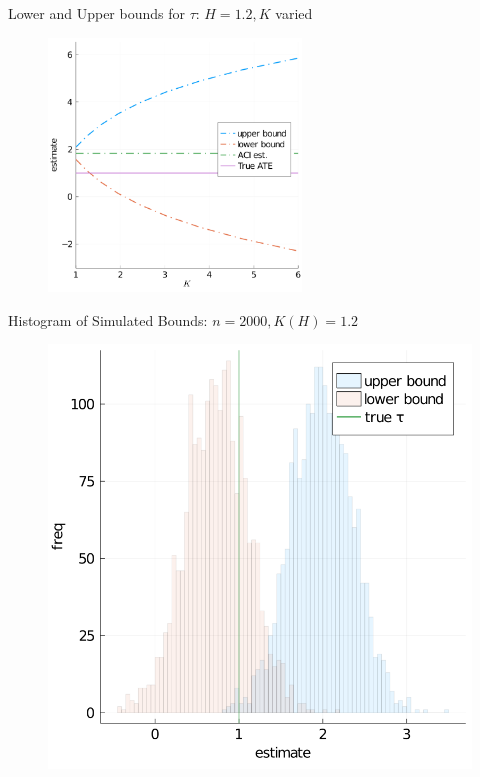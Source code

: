 \documentclass{beamer}					%
\begin{document}
\begin{frame}{Lower and Upper bounds for $\tau$: $H = 1.2, K$ varied}
    \begin{figure}
        \centering
        \includegraphics[width=0.6\textwidth]{../code/fig1.png}
        \label{fig:fig1}
    \end{figure}
\end{frame}

\begin{frame}{Histogram of Simulated Bounds: $n = 2000, K(H) = 1.2$}
    \begin{figure}
        \centering
        \includegraphics[width = 0.7 \textwidth]{../code/fig2.png}
        \label{fig:fig2}
    \end{figure}
\end{frame}
\end{document}
